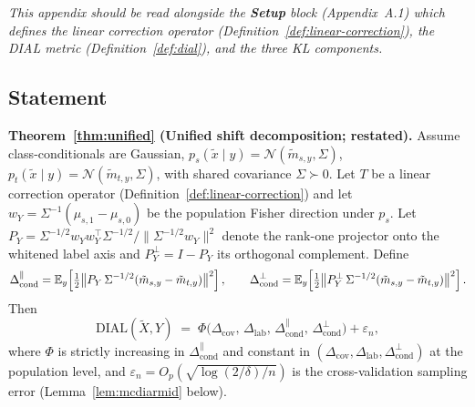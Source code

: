 %
%

\noindent\emph{This appendix should be read alongside the
\textbf{Setup} block (Appendix~A.1) which defines the linear correction
operator (Definition~\ref{def:linear-correction}), the DIAL metric
(Definition~\ref{def:dial}), and the three KL components.}

\subsection{Statement}

\noindent\textbf{Theorem~\ref{thm:unified} (Unified shift decomposition; restated).}
Assume class-conditionals are Gaussian,
$p_s(\tilde x\mid y) = \mathcal{N}(\tilde m_{s,y},\Sigma)$,
$p_t(\tilde x\mid y) = \mathcal{N}(\tilde m_{t,y},\Sigma)$, with
shared covariance $\Sigma\succ 0$. Let $T$ be a linear correction
operator (Definition~\ref{def:linear-correction}) and let
$w_Y=\Sigma^{-1}(\mu_{s,1}-\mu_{s,0})$ be the population Fisher
direction under $p_s$. Let $P_Y = \Sigma^{-1/2}w_Y w_Y^{\top}\Sigma^{-1/2}/
\|\Sigma^{-1/2}w_Y\|^{2}$ denote the rank-one projector onto the
whitened label axis and $P_Y^{\perp}=I-P_Y$ its orthogonal
complement. Define
\[
   \Delta_{\text{cond}}^{\parallel}
   = \mathbb{E}_{y}\!\left[\tfrac12\bigl\|P_Y\,\Sigma^{-1/2}
     (\tilde m_{s,y}-\tilde m_{t,y})\bigr\|^{2}\right],\qquad
   \Delta_{\text{cond}}^{\perp}
   = \mathbb{E}_{y}\!\left[\tfrac12\bigl\|P_Y^{\perp}\,\Sigma^{-1/2}
     (\tilde m_{s,y}-\tilde m_{t,y})\bigr\|^{2}\right].
\]
Then
\begin{equation}
  \mathrm{DIAL}(\tilde X,Y)
  \;=\; \Phi\!\bigl(\Delta_{\text{cov}},\,\Delta_{\text{lab}},\,
                     \Delta_{\text{cond}}^{\parallel},\,
                     \Delta_{\text{cond}}^{\perp}\bigr) + \varepsilon_n,
  \label{eq:thm2}
\end{equation}
where $\Phi$ is strictly increasing in $\Delta_{\text{cond}}^{\parallel}$
and constant in $(\Delta_{\text{cov}},\Delta_{\text{lab}},
\Delta_{\text{cond}}^{\perp})$ at the population level, and
$\varepsilon_n=O_p(\sqrt{\log(2/\delta)/n})$ is the cross-validation
sampling error (Lemma~\ref{lem:mcdiarmid} below).

